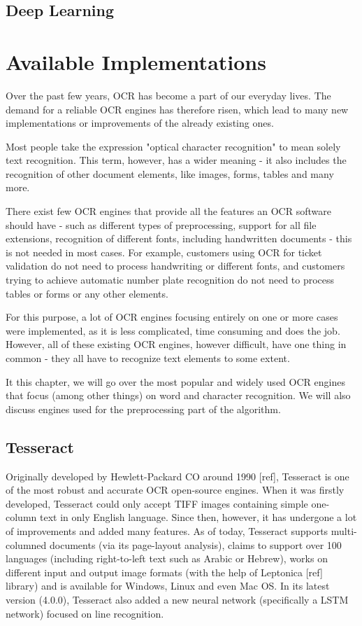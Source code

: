 \subsection{Deep Learning}

\section{Available Implementations}

Over the past few years, OCR has become a part of our everyday lives. The demand for a reliable OCR engines has therefore risen, which lead to many new implementations or improvements of the already existing ones.

Most people take the expression "optical character recognition" to mean solely text recognition. This term, however, has a wider meaning - it also includes the recognition of other document elements, like images, forms, tables and many more.

There exist few OCR engines that provide all the features an OCR software should have - such as different types of preprocessing, support for all file extensions, recognition of different fonts, including handwritten documents - this is not needed in most cases. For example, customers using OCR for ticket validation do not need to process handwriting or different fonts, and customers trying to achieve automatic number plate recognition do not need to process tables or forms or any other elements.

For this purpose, a lot of OCR engines focusing entirely on one or more cases were implemented, as it is less complicated, time consuming and does the job. However, all of these existing OCR engines, however difficult, have one thing in common - they all have to recognize text elements to some extent.

It this chapter, we will go over the most popular and widely used OCR engines that focus (among other things) on word and character recognition. We will also discuss engines used for the preprocessing part of the algorithm.

\subsection{Tesseract}

Originally developed by Hewlett-Packard CO around 1990 [ref], Tesseract is one of the most robust and accurate OCR open-source engines. When it was firstly developed, Tesseract could only accept TIFF images containing simple one-column text in only English language. Since then, however, it has undergone a lot of improvements and added many features. As of today, Tesseract supports multi-columned documents (via its page-layout analysis), claims to support over 100 languages (including right-to-left text such as Arabic or Hebrew), works on different input and output image formats (with the help of Leptonica [ref] library) and is available for Windows, Linux and even Mac OS. In its latest version (4.0.0), Tesseract also added a new neural network (specifically a LSTM network) focused on line recognition. 

